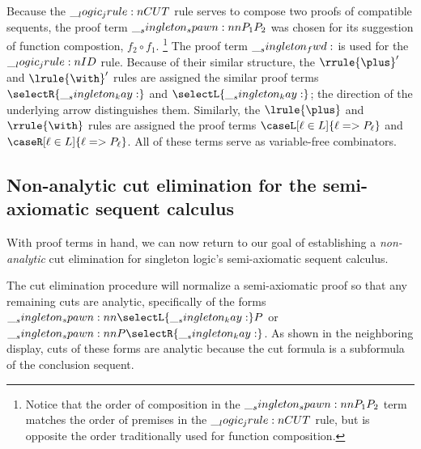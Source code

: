 Because the $\__logic_jrule:n {CUT}$ rule serves to compose two proofs of compatible sequents, the proof term $\__singleton_spawn:nn {P_1} {P_2}$ was chosen for its suggestion of function compostion, $f_2 \circ f_1$.%
\footnote{Notice that the order of composition in the $\__singleton_spawn:nn {P_1} {P_2}$ term matches the order of premises in the $\__logic_jrule:n {CUT}$ rule, but is opposite the order traditionally used for function composition.}
The proof term $\__singleton_fwd:$ is used for the $\__logic_jrule:n {ID}$ rule.
%
Because of their similar structure, the $\rrule{\plus}'$ and $\lrule{\with}'$ rules are assigned the similar proof terms $\selectR{\kay}$ and $\selectL{\kay}$; the direction of the underlying arrow distinguishes them.
Similarly, the $\lrule{\plus}$ and $\rrule{\with}$ rules are assigned the proof terms $\caseL[\ell \in L]{\ell => P_{\ell}}$ and $\caseR[\ell \in L]{\ell => P_{\ell}}$.
%
All of these terms serve as variable-free combinators.%
%
\subsection{Non-analytic cut elimination for the semi-axiomatic sequent calculus}\label{sec:singleton-logic:sax:cutelim}

With proof terms in hand, we can now return to our goal of establishing a \emph{non-analytic} cut elimination  for singleton logic's semi-axiomatic sequent calculus.

The cut elimination procedure will normalize a semi-axiomatic proof so that any remaining cuts are analytic, specifically of the forms $\spawn{\selectL{\kay}}{P}$ or $\spawn{P}{\selectR{\kay}}$.
As shown in the neighboring display,%
%
%
cuts of these forms are analytic because the cut formula is a subformula of the conclusion sequent.

